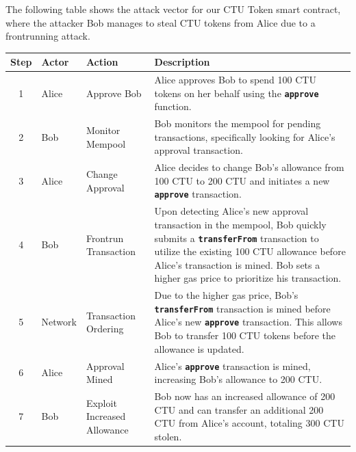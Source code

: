 \documentclass[12pt]{article}
\begin{document}
The following table shows the attack vector for our CTU Token smart contract, where the attacker Bob manages to steal CTU tokens from Alice due to a frontrunning attack.

\begin{table}[H]
  \centering
  \begin{tabular}{|c|l|l|p{8.5cm}|}
      \hline
      \textbf{Step} & \textbf{Actor} & \textbf{Action} & \textbf{Description} \\
      \hline
      \scriptsize{1} & \scriptsize{Alice} & \scriptsize{Approve Bob} & \scriptsize{Alice approves Bob to spend 100 CTU tokens on her behalf using the \texttt{\textbf{approve}} function.} \\
      \hline
      \scriptsize{2} & \scriptsize{Bob} & \scriptsize{Monitor Mempool} & \scriptsize{Bob monitors the mempool for pending transactions, specifically looking for Alice's approval transaction.} \\
      \hline
      \scriptsize{3} & \scriptsize{Alice} & \scriptsize{Change Approval} & \scriptsize{Alice decides to change Bob's allowance from 100 CTU to 200 CTU and initiates a new \texttt{\textbf{approve}} transaction.} \\
      \hline
      \scriptsize{4} & \scriptsize{Bob} & \scriptsize{Frontrun Transaction} & \scriptsize{Upon detecting Alice's new approval transaction in the mempool, Bob quickly submits a \texttt{\textbf{transferFrom}} transaction to utilize the existing 100 CTU allowance before Alice's transaction is mined. Bob sets a higher gas price to prioritize his transaction.} \\
      \hline
      \scriptsize{5} & \scriptsize{Network} & \scriptsize{Transaction Ordering} & \scriptsize{Due to the higher gas price, Bob's \texttt{\textbf{transferFrom}} transaction is mined before Alice's new \texttt{\textbf{approve}} transaction. This allows Bob to transfer 100 CTU tokens before the allowance is updated.} \\
      \hline
      \scriptsize{6} & \scriptsize{Alice} & \scriptsize{Approval Mined} & \scriptsize{Alice's \texttt{\textbf{approve}} transaction is mined, increasing Bob's allowance to 200 CTU.} \\
      \hline
      \scriptsize{7} & \scriptsize{Bob} & \scriptsize{Exploit Increased Allowance} & \scriptsize{Bob now has an increased allowance of 200 CTU and can transfer an additional 200 CTU from Alice's account, totaling 300 CTU stolen.} \\
      \hline
  \end{tabular}
  \label{tab:attack-scenario}
\end{table}
\end{document}
